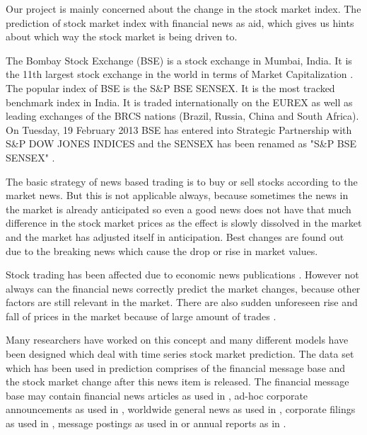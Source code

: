 \documentclass[a4paper,12bp]{report}
\begin{document}
Our project is mainly concerned about the change in the stock market index. The prediction of stock market index with financial news as aid, which gives us hints about which way the stock market is being driven to. 

The Bombay Stock Exchange (BSE) is a stock exchange in Mumbai, India. It is the 11th largest stock exchange in the world in terms of Market Capitalization \cite{ bse:20}. The popular index of BSE is the S\&P BSE SENSEX. It is the most tracked benchmark index in India. It is traded internationally on the EUREX as well as leading exchanges of the BRCS nations (Brazil, Russia, China and South Africa). On Tuesday, 19 February 2013 BSE has entered into Strategic Partnership with S\&P DOW JONES INDICES and the SENSEX has been renamed as "S\&P BSE SENSEX" \cite{ wiki:20143}.

The basic strategy of news based trading is to buy or sell stocks according to the market news. But this is not applicable always, because sometimes the news in the market is already anticipated so even a good news does not have that much difference in the stock market prices as the effect is slowly dissolved in the market and the market has adjusted itself in anticipation. Best changes are found out due to the breaking news which cause the drop or rise in market values. 

Stock trading has been affected due to economic news publications \cite{RePEc:eee:pacfin:v:9:y:2001:i:3:p:195-217}. However not always can the financial news correctly predict the market changes, because other factors are still relevant in the market. There are also sudden unforeseen rise and fall of prices in the market because of large amount of trades \cite{camerer1991information}. 

Many researchers have worked on this concept and many different models have been designed which deal with time series stock market prediction. The data set which has been used in prediction comprises of the financial message base and the stock market change after this news item is released. The financial message base may contain financial news articles as used in \cite{Schumaker:2009}\cite{JOFI:JOFI1362}\cite{1265201}, ad-hoc corporate announcements as used in \cite{conf/wirtschaftsinformatik/GrothM09}\cite{groth2011intraday}, worldwide general news as used in \cite{725072}, corporate filings as used in \cite{JOAR:JOAR382}, message postings as used in \cite{doi:10.1287/mnsc.1070.0704} or annual reports as in \cite{butler:2009}.
\end{document}

